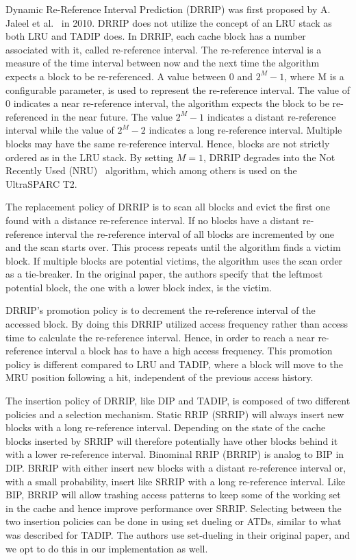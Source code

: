 Dynamic Re-Reference Interval Prediction (DRRIP) was first proposed by A. Jaleel et al.~\cite{Jaleel2010} in 2010.
DRRIP does not utilize the concept of an LRU stack as both LRU and TADIP does.
In DRRIP, each cache block has a number associated with it, called re-reference interval.
The re-reference interval is a measure of the time interval between now and the next time the algorithm expects a block to be re-referenced.
A value between 0 and $2^M - 1$, where M is a configurable parameter, is used to represent the re-reference interval.
The value of 0 indicates a near re-reference interval, the algorithm expects the block to be re-referenced in the near future.
The value $2^M - 1$ indicates a distant re-reference interval while the value of $2^M - 2$ indicates a long re-reference interval.
Multiple blocks may have the same re-reference interval. 
Hence, blocks are not strictly ordered as in the LRU stack.
By setting $M=1$, DRRIP degrades into the Not Recently Used (NRU)~\cite{Microsystems2007} algorithm, which among others is used on the UltraSPARC T2.

The replacement policy of DRRIP is to scan all blocks and evict the first one found with a distance re-reference interval.
If no blocks have a distant re-reference interval the re-reference interval of all blocks are incremented by one and the scan starts over.
This process repeats until the algorithm finds a victim block.
If multiple blocks are potential victims, the algorithm uses the scan order as a tie-breaker.
In the original paper, the authors specify that the leftmost potential block, the one with a lower block index, is the victim.

DRRIP's promotion policy is to decrement the re-reference interval of the accessed block.
By doing this DRRIP utilized access frequency rather than access time to calculate the re-reference interval.
Hence, in order to reach a near re-reference interval a block has to have a high access frequency.
This promotion policy is different compared to LRU and TADIP, where a block will move to the MRU position following a hit, independent of the previous access history.

The insertion policy of DRRIP, like DIP and TADIP, is composed of two different policies and a selection mechanism.
Static RRIP (SRRIP) will always insert new blocks with a long re-reference interval. 
Depending on the state of the cache blocks inserted by SRRIP will therefore potentially have other blocks behind it with a lower re-reference interval.
Binominal RRIP (BRRIP) is analog to BIP in DIP.
BRRIP with either insert new blocks with a distant re-reference interval or, with a small probability, insert like SRRIP with a long re-reference interval.
Like BIP, BRRIP will allow trashing access patterns to keep some of the working set in the cache and hence improve performance over SRRIP.
Selecting between the two insertion policies can be done in using set dueling or ATDs, similar to what was described for TADIP.
The authors use set-dueling in their original paper, and we opt to do this in our implementation as well.

